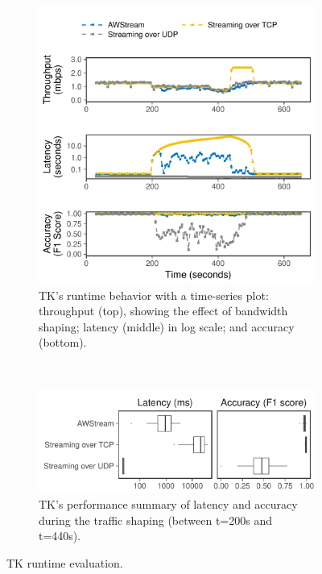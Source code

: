 \begin{figure}[t]
  \begin{subfigure}[t]{\columnwidth}
    \centering
    \includegraphics[width=\columnwidth]{figures/runtime_tk-timeseries.pdf}
    \caption{TK's runtime behavior with a time-series plot: throughput (top),
      showing the effect of bandwidth shaping; latency (middle) in log scale;
      and accuracy (bottom).}
    \label{fig:tk-runtime-timeseries}
  \end{subfigure}
  \vspace{1em}
  \\
  \begin{subfigure}[t]{\columnwidth}
    \centering
    \includegraphics[width=\columnwidth]{figures/runtime_tk-boxplot.pdf}
    \caption{TK's performance summary of latency and accuracy during the traffic
      shaping (between t=200s and t=440s).}
    \label{fig:tk-runtime-boxplot}
  \end{subfigure}
  \caption{TK runtime evaluation.}
  \label{fig:tk-runtime}
\end{figure}

